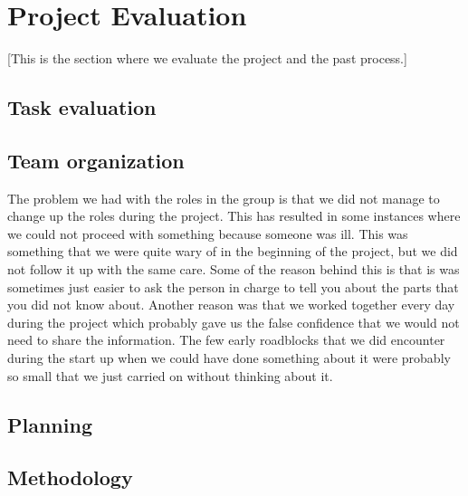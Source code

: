 \section{Project Evaluation}\label{Project Evaluation}
    [This is the section where we evaluate the project and the past process.]
    
    \subsection{Task evaluation}
    
    \subsection{Team organization}
        The problem we had with the roles in the group is that we did not manage to change up the roles during the project. This has resulted in some instances where we could not proceed with something because someone was ill. This was something that we were quite wary of in the beginning of the project, but we did not follow it up with the same care. Some of the reason behind this is that is was sometimes just easier to ask the person in charge to tell you about the parts that you did not know about. Another reason was that we worked together every day during the project which probably gave us the false confidence that we would not need to share the information. The few early roadblocks that we did encounter during the start up when we could have done something about it were probably so small that we just carried on without thinking about it. 
    \subsection{Planning}
    \subsection{Methodology}

